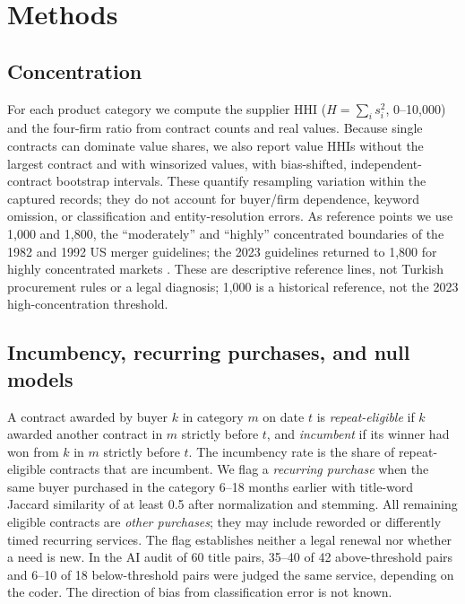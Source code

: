 \documentclass[pdflatex,sn-apa]{sn-jnl}
\begin{document}
\section{Methods}\label{sec:methods}

\subsection{Concentration}
For each product category we compute the supplier HHI ($H=\sum_i s_i^2$, 0--10,000) and the four-firm ratio from contract counts and real values. Because single contracts can dominate value shares, we also report value HHIs without the largest contract and with winsorized values, with bias-shifted, independent-contract bootstrap intervals. These quantify resampling variation within the captured records; they do not account for buyer/firm dependence, keyword omission, or classification and entity-resolution errors. As reference points we use 1,000 and 1,800, the ``moderately'' and ``highly'' concentrated boundaries of the 1982 and 1992 US merger guidelines; the 2023 guidelines returned to 1,800 for highly concentrated markets \citep{HMG1992,MergerGuidelines2023}. These are descriptive reference lines, not Turkish procurement rules or a legal diagnosis; 1,000 is a historical reference, not the 2023 high-concentration threshold.

\subsection{Incumbency, recurring purchases, and null models}
A contract awarded by buyer $k$ in category $m$ on date $t$ is \emph{repeat-eligible} if $k$ awarded another contract in $m$ strictly before $t$, and \emph{incumbent} if its winner had won from $k$ in $m$ strictly before $t$. The incumbency rate is the share of repeat-eligible contracts that are incumbent. We flag a \emph{recurring purchase} when the same buyer purchased in the category 6--18 months earlier with title-word Jaccard similarity of at least 0.5 after normalization and stemming. All remaining eligible contracts are \emph{other purchases}; they may include reworded or differently timed recurring services. The flag establishes neither a legal renewal nor whether a need is new. In the AI audit of 60 title pairs, 35--40 of 42 above-threshold pairs and 6--10 of 18 below-threshold pairs were judged the same service, depending on the coder. The direction of bias from classification error is not known.
\end{document}

